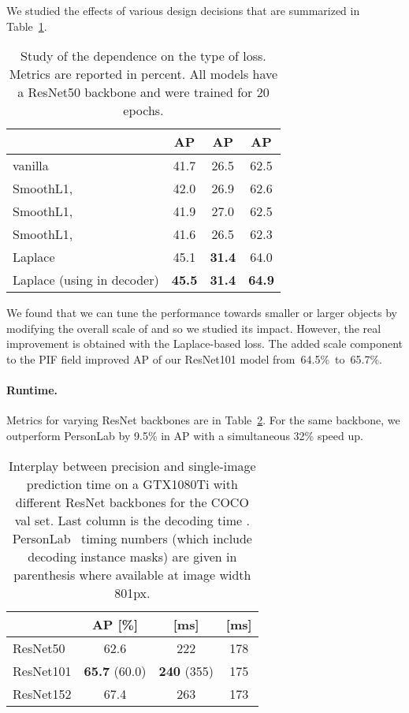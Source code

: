 \documentclass[10pt,twocolumn,letterpaper]{article}
\begin{document}
We studied the effects of various design decisions that are summarized
in Table~\ref{tab:ablation}.
\begin{table}
  \centering
  \begin{tabular}{|l|c c c|}
    \hline
                                           & AP   & AP & AP \\
    \hline\hline
    vanilla                           & 41.7 & 26.5   & 62.5 \\
    SmoothL1,     & 42.0 & 26.9   & 62.6 \\
    SmoothL1,     & 41.9 & 27.0   & 62.5 \\
    SmoothL1,     & 41.6 & 26.5   & 62.3 \\

    Laplace                                & 45.1 & \textbf{31.4} & 64.0 \\
    Laplace (using  in decoder)         & \textbf{45.5} & \textbf{31.4} & \textbf{64.9} \\
    \hline
  \end{tabular}
  \caption{Study of the dependence on the type of  loss.
           Metrics are reported in percent.
           All models have a ResNet50 backbone and were trained for 20 epochs.}
  \label{tab:ablation}
\end{table}
We found that we can tune the performance
towards smaller or larger objects by modifying the overall scale of
 and so we studied its impact. However, the real
improvement is obtained with the Laplace-based loss.
The added scale component  to the PIF field improved AP of our ResNet101
model from~64.5\%~to~65.7\%.

\paragraph{Runtime.}
Metrics for varying ResNet backbones
are in Table~\ref{tab:backbones}. For the same backbone, we outperform
PersonLab by 9.5\% in AP with a simultaneous 32\% speed up.
\begin{table}
  \centering
  \begin{tabular}{|l|c c c|}
    \hline
               & AP [\%] &  [ms] &  [ms] \\
    \hline\hline
    ResNet50   & 62.6 & 222 & 178 \\
    ResNet101  & \textbf{65.7} (60.0) & \textbf{240} (355) & 175 \\
    ResNet152  & 67.4 & 263 & 173 \\
    \hline
  \end{tabular}
  \caption{Interplay between precision and single-image prediction time  on a GTX1080Ti with different ResNet backbones for the COCO val set. Last column is the decoding time . PersonLab~\cite{personlab} timing numbers (which include decoding instance masks) are given in parenthesis where available at image width 801px.}
  \label{tab:backbones}
\end{table}
\end{document}
